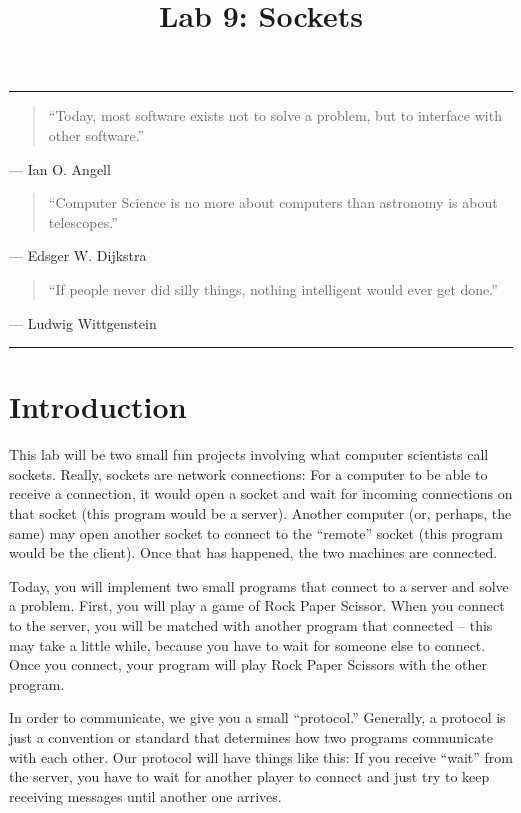 \documentclass[11pt]{cselabheader}
\title{Lab 9: Sockets}
\begin{document}
\maketitle

\hrule
\begin{quotation}
``Today, most software exists not to solve a problem, but to interface with other
software.''
\end{quotation}
\begin{flushright}
--- Ian O. Angell
\end{flushright}

\begin{quotation}
``Computer Science is no more about computers than astronomy is about
telescopes.''
\end{quotation}
\begin{flushright}
--- Edsger W. Dijkstra
\end{flushright}

\begin{quotation}
``If people never did silly things, nothing intelligent would ever get done.''
\end{quotation}
\begin{flushright}
--- Ludwig Wittgenstein
\end{flushright}

\hrule

\section{Introduction}

This lab will be two small fun projects involving what computer scientists call
sockets. Really, sockets are network connections: For a computer to be able to
receive a connection, it would open a socket and wait for incoming connections
on that socket (this program would be a server). Another computer (or, perhaps,
the same) may open another socket to connect to the ``remote'' socket (this
program would be the client). Once that has happened, the two machines are
connected. 

Today, you will implement two small programs that connect to a server and solve
a problem. First, you will play a game of Rock Paper Scissor. When you connect
to the server, you will be matched with another program that connected -- this
may take a little while, because you have to wait for someone else to connect.
Once you connect, your program will play Rock Paper Scissors with the other
program. 

In order to communicate, we give you a small ``protocol.'' Generally, a protocol
is just a convention or standard that determines how two programs communicate
with each other. Our protocol will have things like this: If you receive
``wait'' from the server, you have to wait for another player to connect and
just try to keep receiving messages until another one arrives.
\end{document}
